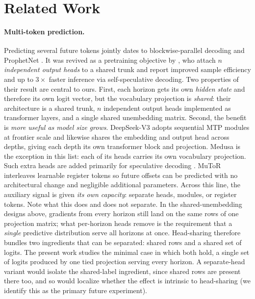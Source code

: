 \section{Related Work}
\label{sec:related}

\paragraph{Multi-token prediction.} Predicting several future tokens jointly dates to blockwise-parallel decoding \citep{stern2018blockwise} and ProphetNet \citep{qi2020prophetnet}. It was revived as a pretraining objective by \citet{gloeckle2024mtp}, who attach $n$ \emph{independent output heads} to a shared trunk and report improved sample efficiency and up to $3\times$ faster inference via self-speculative decoding. Two
properties of their result are central to ours. First, each horizon gets its own
\emph{hidden state} and therefore its own logit vector, but the vocabulary
projection is \emph{shared}: their architecture is a shared trunk, $n$ independent
output heads implemented as transformer layers, and a single shared unembedding
matrix. Second, the benefit is \emph{more useful as model size grows}. DeepSeek-V3
\citep{deepseekv3} adopts sequential MTP modules at frontier scale and likewise
shares the embedding and output head across depths, giving each depth its own
transformer block and projection. Medusa
\citep{cai2024medusa} is the exception in this list: each of its heads carries its
own vocabulary projection. Such extra heads are added primarily for
speculative decoding \citep{samragh2025future}. MuToR \citep{gerontopoulos2025mutor} interleaves
learnable register tokens so future offsets can be predicted with no architectural
change and negligible additional parameters. Across this line, the auxiliary signal is given \emph{its
own capacity}: separate heads, modules, or register tokens. Note what this does and
does not separate. In the shared-unembedding designs above, gradients from every
horizon still land on the same rows of one projection matrix; what per-horizon heads
remove is the requirement that a \emph{single} predictive distribution serve all
horizons at once. Head-sharing therefore bundles two ingredients that can be
separated: shared rows and a shared set of logits. The present work studies the
minimal case in which both hold, a single set of logits produced by one tied
projection serving every horizon. A separate-head variant would isolate the
shared-label ingredient, since shared rows are present there too, and so would localize
whether the effect is intrinsic to head-sharing (we identify this as the primary future
experiment).

